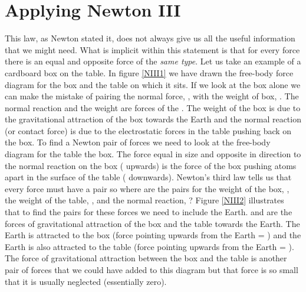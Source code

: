 \section{Applying Newton III}
This law, as Newton stated it, does not always give us all the useful information that we might need.  What is implicit within this statement is that for every force there is an equal and opposite force of the {\it same type}.  Let us take an example of a cardboard box on the table. \nl
In figure \ref{NIII1} we have drawn the free-body force diagram for the box and the table on which it sits.  If we look at the box alone we can make the mistake of pairing the normal force, ,  with the weight of box, .  The normal reaction and the weight are  forces of the . The weight of the box is due to the gravitational attraction of the box towards the Earth and the normal reaction (or contact force) is due to the electrostatic forces in the table pushing back on the box. To find a Newton pair of forces we need to look at the free-body diagram for the table  the box. The force equal in size and opposite in direction to the normal reaction on the box ( upwards) is the force of the box pushing atoms apart in the surface of the table ( downwards).\nl
Newton's third law tells us that every force must have a pair so where are the pairs for the weight of the box, , the weight of the table, , and the normal reaction, ?  Figure \ref{NIII2} illustrates that to find the pairs for these forces we need to include the Earth.    and  are the forces of gravitational attraction of the box and the table towards the Earth.  The Earth is attracted to the box (force pointing upwards from the Earth = ) and the Earth is also attracted to the table (force pointing upwards from the Earth = ).\nl
The force of gravitational attraction between the box and the table is another pair of forces that we could have added to this diagram but that force is so small that it is usually neglected (essentially zero).

